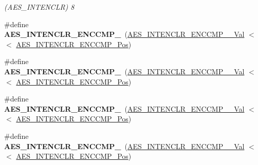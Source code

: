 \begin{DoxyCompactItemize}
\begin{DoxyCompactList}\small\item\em (A\+E\+S\+\_\+\+I\+N\+T\+E\+N\+C\+L\+R) 8 \end{DoxyCompactList}\item 
\hypertarget{group___s_a_m_l21___a_e_s_ga8e81a3dd34671342f48c3aa2d099a132}{}\#define {\bfseries A\+E\+S\+\_\+\+I\+N\+T\+E\+N\+C\+L\+R\+\_\+\+E\+N\+C\+C\+M\+P\+\_}~(\hyperlink{group___s_a_m_l21___a_e_s_gaeec3d301f2c09f00485fc77411ce7176}{A\+E\+S\+\_\+\+I\+N\+T\+E\+N\+C\+L\+R\+\_\+\+E\+N\+C\+C\+M\+P\+\_\+\_\+\+Val}     $<$$<$ \hyperlink{group___s_a_m_l21___a_e_s_ga9f0b2df1c42584d5ac86a900ad27543a}{A\+E\+S\+\_\+\+I\+N\+T\+E\+N\+C\+L\+R\+\_\+\+E\+N\+C\+C\+M\+P\+\_\+\+Pos})\label{group___s_a_m_l21___a_e_s_ga8e81a3dd34671342f48c3aa2d099a132}

\item 
\hypertarget{group___s_a_m_l21___a_e_s_gafd033dc22570d279ff76c2c7c30b249c}{}\#define {\bfseries A\+E\+S\+\_\+\+I\+N\+T\+E\+N\+C\+L\+R\+\_\+\+E\+N\+C\+C\+M\+P\+\_}~(\hyperlink{group___s_a_m_l21___a_e_s_ga2c8ac03e955ae2091868637521b98649}{A\+E\+S\+\_\+\+I\+N\+T\+E\+N\+C\+L\+R\+\_\+\+E\+N\+C\+C\+M\+P\+\_\+\_\+\+Val}     $<$$<$ \hyperlink{group___s_a_m_l21___a_e_s_ga9f0b2df1c42584d5ac86a900ad27543a}{A\+E\+S\+\_\+\+I\+N\+T\+E\+N\+C\+L\+R\+\_\+\+E\+N\+C\+C\+M\+P\+\_\+\+Pos})\label{group___s_a_m_l21___a_e_s_gafd033dc22570d279ff76c2c7c30b249c}

\item 
\hypertarget{group___s_a_m_l21___a_e_s_ga4f0e07f5472e7ded7492440227dd00d8}{}\#define {\bfseries A\+E\+S\+\_\+\+I\+N\+T\+E\+N\+C\+L\+R\+\_\+\+E\+N\+C\+C\+M\+P\+\_}~(\hyperlink{group___s_a_m_l21___a_e_s_ga7b2cd1e4bd933d52807a858da1dacd29}{A\+E\+S\+\_\+\+I\+N\+T\+E\+N\+C\+L\+R\+\_\+\+E\+N\+C\+C\+M\+P\+\_\+\_\+\+Val}     $<$$<$ \hyperlink{group___s_a_m_l21___a_e_s_ga9f0b2df1c42584d5ac86a900ad27543a}{A\+E\+S\+\_\+\+I\+N\+T\+E\+N\+C\+L\+R\+\_\+\+E\+N\+C\+C\+M\+P\+\_\+\+Pos})\label{group___s_a_m_l21___a_e_s_ga4f0e07f5472e7ded7492440227dd00d8}

\item 
\hypertarget{group___s_a_m_l21___a_e_s_ga6c25b5b62611b99c58b9436b5a58de9a}{}\#define {\bfseries A\+E\+S\+\_\+\+I\+N\+T\+E\+N\+C\+L\+R\+\_\+\+E\+N\+C\+C\+M\+P\+\_}~(\hyperlink{group___s_a_m_l21___a_e_s_gad41f91b862c2e6e70e7ebd4c8fc6ac40}{A\+E\+S\+\_\+\+I\+N\+T\+E\+N\+C\+L\+R\+\_\+\+E\+N\+C\+C\+M\+P\+\_\+\_\+\+Val}     $<$$<$ \hyperlink{group___s_a_m_l21___a_e_s_ga9f0b2df1c42584d5ac86a900ad27543a}{A\+E\+S\+\_\+\+I\+N\+T\+E\+N\+C\+L\+R\+\_\+\+E\+N\+C\+C\+M\+P\+\_\+\+Pos})\label{group___s_a_m_l21___a_e_s_ga6c25b5b62611b99c58b9436b5a58de9a}


\end{DoxyCompactItemize}
